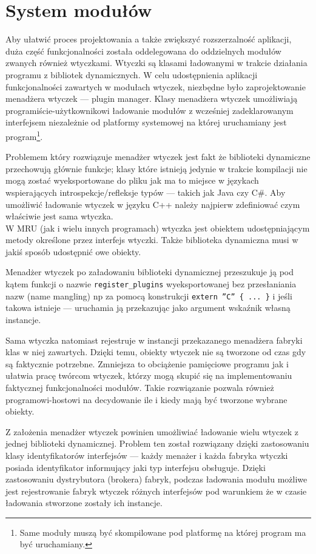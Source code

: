 \section{System modułów}
\label{system-modulow}
\par
Aby ułatwić proces projektowania a także zwiększyć rozszerzalność aplikacji, duża część funkcjonalności została oddelegowana do oddzielnych modułów zwanych również wtyczkami.
Wtyczki są klasami ładowanymi w trakcie działania programu z bibliotek dynamicznych.
W celu udostępnienia aplikacji funkcjonalności zawartych w modułach wtyczek, niezbędne było zaprojektowanie menadżera wtyczek --- plugin manager.
Klasy menadżera wtyczek umożliwiają programiście-użytkownikowi ładowanie modułów z wcześniej zadeklarowanym interfejsem niezależnie od platformy systemowej na której uruchamiany jest program\footnote{Same moduły muszą być skompilowane pod platformę na której program ma być uruchamiany.}.

\par
Problemem który rozwiązuje menadżer wtyczek jest fakt że biblioteki dynamiczne przechowują głównie funkcje; klasy które istnieją jedynie w trakcie kompilacji nie mogą zostać wyeksportowane do pliku jak ma to miejsce w językach wspierających introspekcje/refleksje typów --- takich jak Java czy C\#.
Aby umożliwić ładowanie wtyczek w języku C++ należy najpierw zdefiniować czym właściwie jest sama wtyczka.\\

W MRU (jak i wielu innych programach) wtyczka jest obiektem udostępniającym metody określone przez interfejs wtyczki. Także biblioteka dynamiczna musi w jakiś sposób udostępnić owe obiekty.

\par
Menadżer wtyczek po załadowaniu biblioteki dynamicznej przeszukuje ją pod kątem funkcji o nazwie \texttt{register\_plugins} wyeksportowanej bez przesłaniania nazw (name mangling) np za pomocą konstrukcji \texttt{extern ''C'' \{ ... \}} i jeśli takowa istnieje --- uruchamia ją przekazując jako argument wskaźnik własną instancje.
\par
Sama wtyczka natomiast rejestruje w instancji przekazanego menadżera fabryki klas w niej zawartych.
Dzięki temu, obiekty wtyczek nie są tworzone od czas gdy są faktycznie potrzebne. Zmniejsza to obciążenie pamięciowe programu jak i ułatwia pracę twórcom wtyczek, którzy mogą skupić się na implementowaniu faktycznej funkcjonalności modułów. Takie rozwiązanie pozwala również programowi-hostowi na decydowanie ile i kiedy mają być tworzone wybrane obiekty.
\par
Z założenia menadżer wtyczek powinien umożliwiać ładowanie wielu wtyczek z jednej biblioteki dynamicznej.
Problem ten został rozwiązany dzięki zastosowaniu klasy identyfikatorów interfejsów --- każdy menażer i każda fabryka wtyczki posiada identyfikator informujący jaki typ interfejsu obsługuje. Dzięki zastosowaniu dystrybutora (brokera) fabryk, podczas ładowania modułu możliwe jest rejestrowanie fabryk wtyczek różnych interfejsów pod warunkiem że w czasie ładowania stworzone zostały ich instancje.

